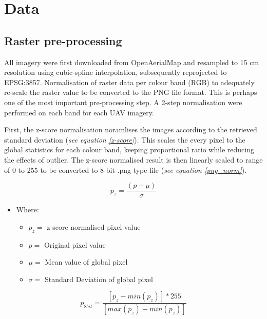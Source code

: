 \documentclass[11pt, a4paper, twoside]{report}
\begin{document}
\section{Data}\label{Data}

\subsection{Raster pre-processing}

All imagery were first downloaded from OpenAerialMap and resampled to 15 cm resolution using cubic-spline interpolation, subsequently reprojected to EPSG:3857. Normalisation of raster data per colour band (RGB) to adequately re-scale the raster value to be converted to the PNG file format. This is perhaps one of the most important pre-processing step. A 2-step normalisation were performed on each band for each UAV imagery.\\\par

First, the z-score normalisation noramlises the images according to the retrieved standard deviation (\textit{see equation \ref{z-score}}). This scales the every pixel to the global statistics for each colour band, keeping proportional ratio while reducing the effects of outlier. The z-score normalised result is then linearly scaled to range of 0 to 255 to be converted to 8-bit .png type file (\textit{see equation \ref{png_norm}}).

\begin{equation}
  \label{z-score}
  p_{z} = \frac{(p - \mu)}{\sigma}
\end{equation}

\begin{itemize}
  \item Where:
    \begin{itemize}
      \item $p_{z} =$ z-score normalised pixel value
      \item $p =$ Original pixel value
      \item $\mu =$ Mean value of global pixel
      \item $\sigma =$ Standard Deviation of global pixel
    \end{itemize}
\end{itemize}

\begin{equation}
  \label{png_norm}
  p_{8 bit} = \frac{[p_{z} - min(p_{z})] * 255}{[max(p_{z}) - min(p_{z})]}
\end{equation}
\end{document}
